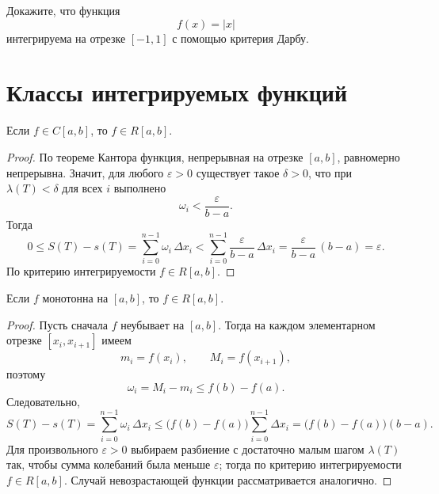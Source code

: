 \begin{task}
Докажите, что функция
\[
 f(x)=|x|
\]
интегрируема на отрезке $[-1,1]$ с помощью критерия Дарбу.
\end{task}

\section{Классы интегрируемых функций}

\begin{theorem}
Если $f\in C[a,b]$, то $f\in R[a,b]$.


\begin{proof}
По теореме Кантора функция, непрерывная на отрезке $[a,b]$, равномерно непрерывна.
Значит, для любого $\varepsilon>0$ существует такое $\delta>0$, что при $\lambda(T)<\delta$ для всех $i$ выполнено
\[
\omega_i<\frac{\varepsilon}{b-a}.
\]
Тогда
\[
0\leqslant S(T)-s(T)=\sum\limits_{i=0}^{n-1}\omega_i\,\Delta x_i
<\sum\limits_{i=0}^{n-1}\frac{\varepsilon}{b-a}\,\Delta x_i
=\frac{\varepsilon}{b-a}\,(b-a)=\varepsilon.
\]
По критерию интегрируемости $f\in R[a,b]$.
\end{proof}
\end{theorem}

\begin{theorem}
Если $f$ монотонна на $[a,b]$, то $f\in R[a,b]$.

\begin{proof}
Пусть сначала $f$ неубывает на $[a,b]$.
Тогда на каждом элементарном отрезке $[x_i,x_{i+1}]$ имеем
\[
 m_i=f(x_i),\qquad M_i=f(x_{i+1}),
\]
поэтому
\[
\omega_i=M_i-m_i\leqslant f(b)-f(a).
\]
Следовательно,
\[
S(T)-s(T)=\sum\limits_{i=0}^{n-1}\omega_i\,\Delta x_i
\leqslant \bigl(f(b)-f(a)\bigr)\sum\limits_{i=0}^{n-1}\Delta x_i
=\bigl(f(b)-f(a)\bigr)(b-a).
\]
Для произвольного $\varepsilon>0$ выбираем разбиение с достаточно малым шагом $\lambda(T)$ так, чтобы сумма колебаний была меньше $\varepsilon$; тогда по критерию интегрируемости $f\in R[a,b]$.
Случай невозрастающей функции рассматривается аналогично.
\end{proof}
\end{theorem}
